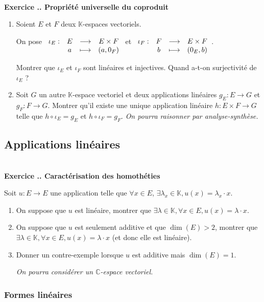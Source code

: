 \documentclass{article}
\newcommand{\fonction}[5]{\raisebox{-0.5\baselineskip}{$\begin{array}{lccc}
    #1: & #2 & \longrightarrow & #3 \\
        & #4 & \longmapsto & #5 \end{array}$}}
\newcommand{\mb}[1]{\mathbb{#1}}
\newcounter{exo}
\newcommand{\exercice}[1][\null]{\textbf{\\ Exercice \thesection.\theexo. #1} \addtocounter{exo}{1}}
\begin{document}
\exercice[Propriété universelle du coproduit]

\begin{enumerate}

\item Soient $E$ et $F$ deux $\mb{K}$-espaces vectoriels.

On pose $\fonction{\iota_E}{E}{E\times F}{a}{(a, 0_F)}$ et $\fonction{\iota_F}{F}{E\times F}{b}{(0_E, b)}$.

Montrer que $\iota_E$ et $\iota_F$ sont linéaires et injectives. Quand a-t-on surjectivité de $\iota_E$ ?

\item Soit $G$ un autre $\mb{K}$-espace vectoriel et deux applications linéaires $g_E : E \rightarrow G$ et $g_F : F \rightarrow G$. Montrer qu'il existe une unique application linéaire $h : E \times F \rightarrow G$ telle que $h \circ \iota_E = g_E$ et $h \circ \iota_F= g_F$.  \emph{On pourra raisonner par analyse-synthèse.}

\end{enumerate}



\subsection{Applications linéaires}


\exercice[Caractérisation des homothéties] 

Soit $u : E \rightarrow E$ une application telle que $\forall x \in E$, $\exists \lambda_x \in \mb{K}, u(x) = \lambda_x \cdot x$.

\begin{enumerate}

\item On suppose que $u$ est linéaire, montrer que $\exists \lambda \in \mb{K}, \forall x \in E, u(x) = \lambda \cdot x$.

\item On suppose que $u$ est seulement additive et que $\dim(E) > 2$, montrer que $\exists \lambda \in \mb{K}, \forall x \in E, u(x) = \lambda \cdot x$ (et donc elle est linéaire).

\item Donner un contre-exemple lorsque $u$ est additive mais $\dim(E) = 1$.

\emph{On pourra considérer un $\mb{C}$-espace vectoriel.}

\end{enumerate}

\subsubsection{Formes linéaires}
\end{document}
